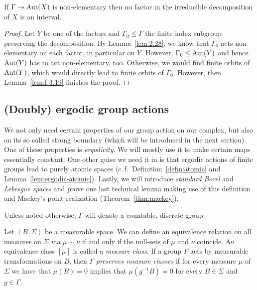 \begin{cor}
  \label{cor:f-3.21}
  If \(\Gamma \to \operatorname{Aut}(X)\) is non-elementary then no factor in the irreducible decomposition of \(X\) is an interval.
\end{cor}

\begin{proof}
  Let \(Y\) be one of the factors and \(\Gamma_0 \leq \Gamma\) the finite index subgroup preserving the decomposition. By Lemma~\ref{lem:2.28}, we know that \(\Gamma_0\) acts non-elementary on each factor, in particular on \(Y\). However, \(\Gamma_0 \leq \operatorname{Aut}(Y)\) and hence \(\operatorname{Aut}(Y)\) has to act non-elementary, too. Otherwise, we would find finite orbits of \(\operatorname{Aut}(Y)\), which would directly lead to finite orbits of \(\Gamma_0\). However, then Lemma~\ref{lem:f-3.19} finishes the proof.
\end{proof}

\subsection{(Doubly) ergodic group actions}
\label{sec:ergodic}

We not only need certain properties of our group action on our complex, but also on its so called strong boundary (which will be introduced in the next section). One of these properties is \emph{ergodicity}. We will mostly use it to make certain maps essentially constant. One other guise we need it in is that ergodic actions of finite groups lead to purely atomic spaces (c.\,f.\ Definition~\ref{defin:atomic} and Lemma~\ref{lem:ergodic-atomic}). Lastly, we will introduce \emph{standard Borel} and \emph{Lebesgue spaces} and prove one last technical lemma making use of this definition and Mackey's point realization (Theorem~\ref{thm:mackey}).

Unless noted otherwise, \(\Gamma\) will denote a countable, discrete group.

\begin{defin}
  Let \((B, \Sigma)\) be a measurable space. We can define an equivalence relation on all measures on \(\Sigma\) via \(\mu \sim \nu\) if and only if the null-sets of \(\mu\) and \(\nu\) coincide. An equivalence class \([\mu]\) is called a \emph{measure class}. If a group \(\Gamma\) acts by measurable transformations on \(B\), then \(\Gamma\) \emph{preserves measure classes} if for every measure \(\mu\) of \(\Sigma\) we have that \(\mu(B) = 0\) implies that \(\mu(g^{-1} B) = 0\) for every \(B \in \Sigma\) and \(g \in \Gamma\).
\end{defin}


